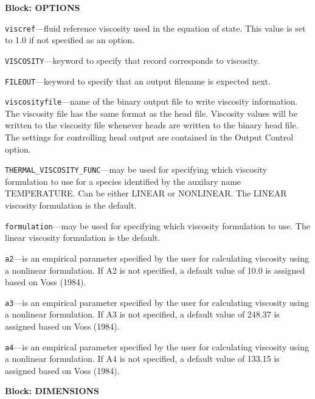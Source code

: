 
\item \textbf{Block: OPTIONS}

\begin{description}
\item \texttt{viscref}---fluid reference viscosity used in the equation of state.  This value is set to 1.0 if not specified as an option.

\item \texttt{VISCOSITY}---keyword to specify that record corresponds to viscosity.

\item \texttt{FILEOUT}---keyword to specify that an output filename is expected next.

\item \texttt{viscosityfile}---name of the binary output file to write viscosity information.  The viscosity file has the same format as the head file.  Viscosity values will be written to the viscosity file whenever heads are written to the binary head file.  The settings for controlling head output are contained in the Output Control option.

\item \texttt{THERMAL\_VISCOSITY\_FUNC}---may be used for specifying which viscosity formulation to use for a species identified by the auxilary name TEMPERATURE. Can be either LINEAR or NONLINEAR. The LINEAR viscosity formulation is the default.

\item \texttt{formulation}---may be used for specifying which viscosity formulation to use.  The linear viscosity formulation is the default.

\item \texttt{a2}---is an empirical parameter specified by the user for calculating viscosity using a nonlinear formulation.  If A2 is not specified, a default value of 10.0 is assigned based on Voss (1984).

\item \texttt{a3}---is an empirical parameter specified by the user for calculating viscosity using a nonlinear formulation.  If A3 is not specified, a default value of 248.37 is assigned based on Voss (1984).

\item \texttt{a4}---is an empirical parameter specified by the user for calculating viscosity using a nonlinear formulation.  If A4 is not specified, a default value of 133.15 is assigned based on Voss (1984).

\end{description}
\item \textbf{Block: DIMENSIONS}

